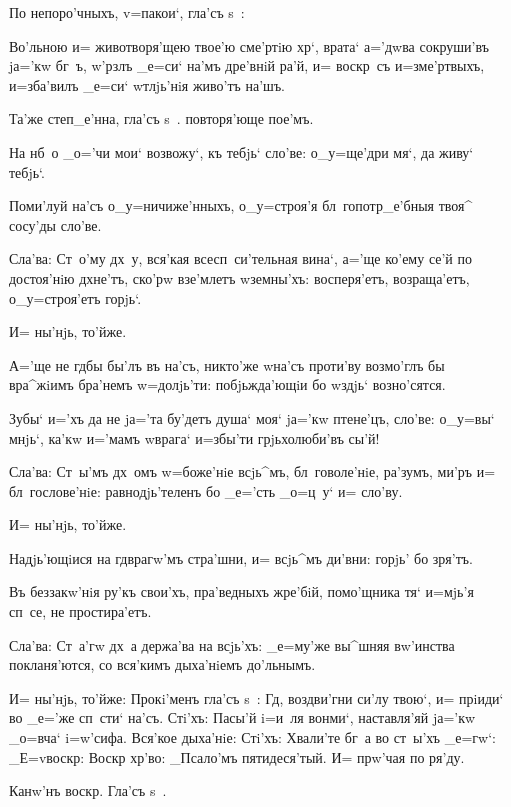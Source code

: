 По непоро'чныхъ, v=пакои`, гла'съ s~:

Во'льною и= животворя'щею твое'ю сме'ртiю хр`, 
врата` а='дwва сокруши'въ jа='кw бг~ъ, w'рзлъ _е=си` 
на'мъ дре'внiй ра'й, и= воскр~съ и=з\ъ ме'ртвыхъ, 
и=зба'вилъ _е=си` w\т тлjь'нiя живо'тъ на'шъ. 

Та'же степ_е'нна, гла'съ s~. %
повторя'юще пое'мъ.

На нб~о _о='чи мои` возвожу`, къ тебjь` сло'ве: 
о_у=ще'дри мя`, да живу` тебjь`.

Поми'луй на'съ о_у=ничиже'нныхъ, о_у=строя'я 
бл~гопотр_е'бныя твоя^ сосу'ды сло'ве.

Сла'ва: Ст~о'му дх~у, вся'кая всесп~си'тельная вина`, 
а='ще ко'ему се'й по достоя'нiю дхне'тъ, ско'рw взе'млетъ 
w\т земны'хъ: восперя'етъ, возраща'етъ, о_у=строя'етъ 
горjь`. 

И= ны'нjь, то'йже. 


А='ще не гд бы бы'лъ въ на'съ, никто'же w\т на'съ 
проти'ву возмо'глъ бы вра^жiимъ бра'немъ w=долjь'ти: 
побjьжда'ющiи бо w\т здjь` возно'сятся.

Зубы` и='хъ да не jа='та бу'детъ душа` моя` jа='кw 
птене'цъ, сло'ве: о_у=вы` мнjь`, ка'кw и='мамъ w\т врага` 
и=збы'ти грjьхолюби'въ сы'й!

Сла'ва: Ст~ы'мъ дх~омъ w=боже'нiе всjь^мъ, 
бл~говоле'нiе, ра'зумъ, ми'ръ и= бл~гослове'нiе: 
равнодjь'теленъ бо _е='сть _о=ц~у` и= сло'ву. 

И= ны'нjь, то'йже. 


Надjь'ющiися на гд врагw'мъ стра'шни, и= всjь^мъ 
ди'вни: горjь' бо зря'тъ.

Въ беззакw'нiя ру'къ свои'хъ, пра'ведныхъ жре'бiй, 
помо'щника тя` и=мjь'я сп~се, не простира'етъ.

Сла'ва: Ст~а'гw дх~а держа'ва на всjь'хъ: _е=му'же 
вы^шняя вw'инства покланя'ются, со вся'кимъ дыха'нiемъ 
до'льнымъ.

И= ны'нjь, то'йже: Прокi'менъ гла'съ s~: Гд, 
воздви'гни си'лу твою`, и= прiиди` во _е='же сп~сти` 
на'съ. Стi'хъ: Пасы'й i=и~ля вонми`, наставля'яй jа='кw 
_о=вча` i=w'сифа. Вся'кое дыха'нiе: Стi'хъ: Хвали'те бг~а 
во ст~ы'хъ _е=гw`: _Е=v воскр: Воскр 
хр'во: _Псало'мъ пятидеся'тый. И= прw'чая по ря'ду.

Канw'нъ воскр. Гла'съ s~.


